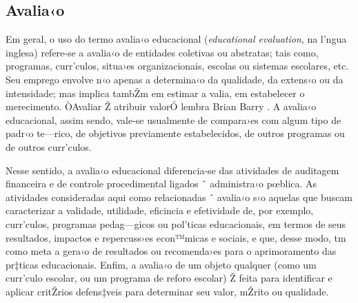 \documentclass[a4paper, 12pt]{article}
\begin{document}
\vspace*{1cm} 





\subsection{Avalia‹o}

Em geral, o uso do termo avalia‹o educacional (\emph{educational evaluation}, na l’ngua inglesa) refere-se a avalia‹o de entidades coletivas ou abstratas; tais como, programas, curr’culos, situa›es organizacionais, escolas ou sistemas escolares, etc. Seu emprego envolve n‹o apenas a determina‹o da qualidade, da extens‹o ou da intensidade; mas implica tambŽm em estimar a valia, em estabelecer o merecimento.  ÒAvaliar Ž atribuir valorÓ lembra Brian Barry \citeyear{barry_political_1975}. A avalia‹o educacional, assim sendo, vale-se usualmente de compara›es com algum tipo de padr‹o te—rico, de objetivos previamente estabelecidos, de outros programas ou de outros curr’culos.

Nesse sentido, a avalia‹o educacional diferencia-se das atividades de auditagem financeira e de controle procedimental ligados ˆ administra‹o pœblica. As atividades consideradas aqui como relacionadas ˆ avalia‹o s‹o aquelas que buscam caracterizar a validade, utilidade, eficincia e efetividade de, por exemplo, curr’culos, programas pedag—gicos ou pol’ticas educacionais, em termos de seus resultados, impactos e repercuss›es econ™micas e sociais, e que, desse modo, tm como meta a gera‹o de resultados ou recomenda›es para o aprimoramento das pr‡ticas educacionais. Enfim, a avalia‹o de um objeto qualquer (como um curr’culo escolar, ou um programa de reforo escolar) Ž feita para identificar e aplicar critŽrios defens‡veis para determinar seu valor, mŽrito ou qualidade.
\end{document}
